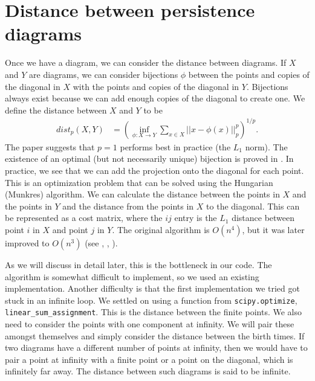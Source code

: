 \documentclass[codesnippet]{jss}
\begin{document}
\section[Distance diagrams]{Distance between persistence diagrams}
Once we have a diagram, we can consider the distance between diagrams.  If $X$ and $Y$ are diagrams, we can consider bijections $\phi$ between the points and copies of the diagonal in $X$ with the points and copies of the diagonal in $Y$.  Bijections always exist because we can add enough copies of the diagonal to create one.  We define the distance between $X$ and $Y$ to be
\begin{align}
dist_p(X,Y) &= \left(\inf_{\phi: X \to Y}\sum_{x \in X} ||x - \phi(x)||_p^p\right)^{1/p}.
\end{align}
The paper suggests that $p=1$ performs best in practice (the $L_1$ norm).  The existence of an optimal (but not necessarily unique) bijection is proved in \cite{turn13}.    In practice, we see that we can add the projection onto the diagonal for each point.  This is an optimization problem that can be solved using the Hungarian (Munkres) algorithm.  We can calculate the distance between the points in $X$ and the points in $Y$ and the distance from the points in $X$ to the diagonal.  This can be represented as a cost matrix, where the $ij$ entry is the $L_1$ distance between point $i$ in $X$ and point $j$ in $Y$.  The original algorithm is $O(n^4)$, but it was later improved to $O(n^3)$ (see \cite{kuhn55}, \cite{kuhn56}, \cite{munk57}).  

As we will discuss in detail later, this is the bottleneck in our code.  The algorithm is somewhat difficult to implement, so we used an existing implementation.  Another difficulty is that the first implementation we tried got stuck in an infinite loop.  We settled on using a function from \texttt{scipy.optimize}, \texttt{linear\_sum\_assignment}.  This is the distance between the finite points.  We also need to consider the points with one component at infinity.  We will pair these amongst themselves and simply consider the distance between the birth times.  If two diagrams have a different number of points at infinity, then we would have to pair a point at infinity with a finite point or a point on the diagonal, which is infinitely far away.  The distance between such diagrams is said to be infinite.  
\end{document}
